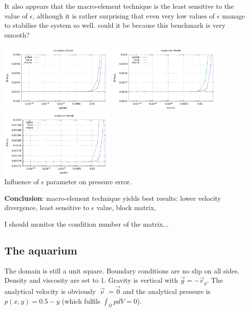 It also appears that the macro-element technique is the least sensitive to the value of $\epsilon$, 
although it is rather surprising that even very low values of $\epsilon$ manage to stabilise the 
system so well. could it be because this benchmark is very smooth? 
\begin{center}
\includegraphics[width=5.7cm]{python_codes/fieldstone_115/results/dh/errorsP_32_eps}
\includegraphics[width=5.7cm]{python_codes/fieldstone_115/results/dh/errorsP_64_eps}
\includegraphics[width=5.7cm]{python_codes/fieldstone_115/results/dh/errorsP_96_eps}\\
{\captionfont Influence of $\epsilon$ parameter on pressure error.}
\end{center}

{\bf Conclusion}: macro-element technique yields best results: lower velocity divergence, 
least sensitive to $\epsilon$ value, block matrix,

I should monitor the condition number of the matrix...

\newpage
\subsection*{The aquarium}

The domain is still a unit square. Boundary conditions are no slip on all sides. 
Density and viscosity are set to 1. Gravity is vertical with $\vec{g}=-\vec{e}_y$.
The analytical velocity is obviously $\vec\upnu=\vec{0}$ and the analytical pressure
is $p(x,y)=0.5-y$ (which fulfils $\int_\Omega p dV=0$).

